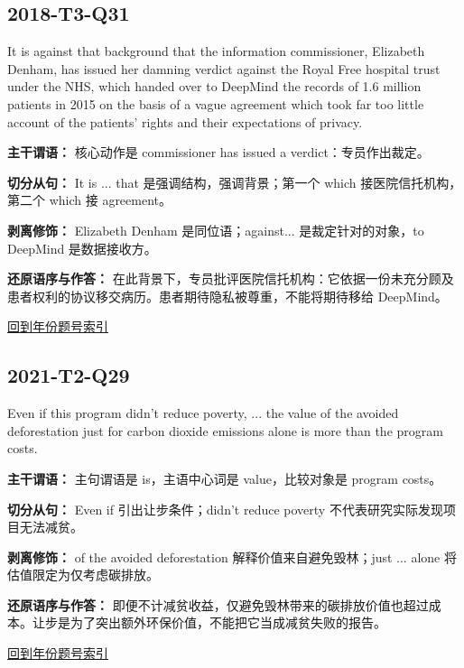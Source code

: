 \documentclass[11pt,a4paper]{article}
\begin{document}
\subsection{2018-T3-Q31}
\begin{evidence}It is against that background that the information commissioner, Elizabeth Denham, has issued her damning verdict against the Royal Free hospital trust under the NHS, which handed over to DeepMind the records of 1.6 million patients in 2015 on the basis of a vague agreement which took far too little account of the patients’ rights and their expectations of privacy.\end{evidence}
\noindent\textbf{主干谓语：} 核心动作是 commissioner has issued a verdict：专员作出裁定。\par\smallskip
\noindent\textbf{切分从句：} It is ... that 是强调结构，强调背景；第一个 which 接医院信托机构，第二个 which 接 agreement。\par\smallskip
\noindent\textbf{剥离修饰：} Elizabeth Denham 是同位语；against... 是裁定针对的对象，to DeepMind 是数据接收方。\par\smallskip
\noindent\textbf{还原语序与作答：} 在此背景下，专员批评医院信托机构：它依据一份未充分顾及患者权利的协议移交病历。患者期待隐私被尊重，不能将期待移给 DeepMind。\par\smallskip
\hyperref[idx-2018-T3-Q31]{回到年份题号索引}\par
\clearpage
\subsection{2021-T2-Q29}
\begin{evidence}Even if this program didn’t reduce poverty, ... the value of the avoided deforestation just for carbon dioxide emissions alone is more than the program costs.\end{evidence}
\noindent\textbf{主干谓语：} 主句谓语是 is，主语中心词是 value，比较对象是 program costs。\par\smallskip
\noindent\textbf{切分从句：} Even if 引出让步条件；didn’t reduce poverty 不代表研究实际发现项目无法减贫。\par\smallskip
\noindent\textbf{剥离修饰：} of the avoided deforestation 解释价值来自避免毁林；just ... alone 将估值限定为仅考虑碳排放。\par\smallskip
\noindent\textbf{还原语序与作答：} 即便不计减贫收益，仅避免毁林带来的碳排放价值也超过成本。让步是为了突出额外环保价值，不能把它当成减贫失败的报告。\par\smallskip
\hyperref[idx-2021-T2-Q29]{回到年份题号索引}\par
\end{document}
